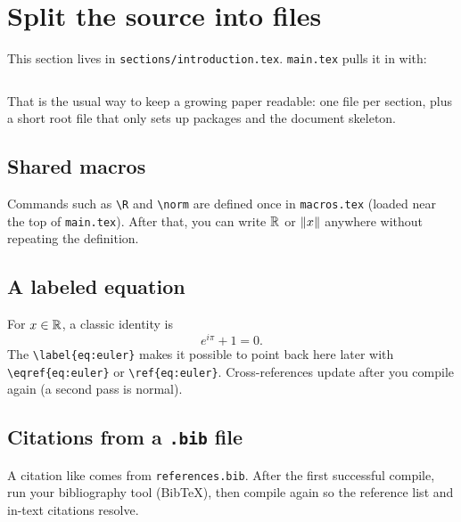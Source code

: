 \section{Split the source into files}
\label{sec:intro}

This section lives in \texttt{sections/introduction.tex}.
\texttt{main.tex} pulls it in with:

\begin{verbatim}

\end{verbatim}

That is the usual way to keep a growing paper readable: one file per section,
plus a short root file that only sets up packages and the document skeleton.

\subsection{Shared macros}
Commands such as \texttt{\textbackslash R} and \texttt{\textbackslash norm}
are defined once in \texttt{macros.tex} (loaded near the top of
\texttt{main.tex}). After that, you can write $\mathbb{R}$ or $\left\lVert x \right\rVert$ anywhere
without repeating the definition.

\subsection{A labeled equation}
For $x \in \mathbb{R}$, a classic identity is
\begin{equation}
\label{eq:euler}
  e^{i\pi} + 1 = 0.
\end{equation}
The \texttt{\textbackslash label\{eq:euler\}} makes it possible to point back
here later with \texttt{\textbackslash eqref\{eq:euler\}} or
\texttt{\textbackslash ref\{eq:euler\}}. Cross-references update after you
compile again (a second pass is normal).

\subsection{Citations from a \texttt{.bib} file}
A citation like \cite{lamport94} comes from \texttt{references.bib}.
After the first successful compile, run your bibliography tool (BibTeX), then
compile again so the reference list and in-text citations resolve.
